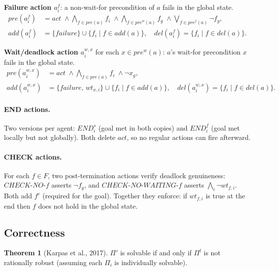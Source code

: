 \documentclass{article}
\theoremstyle{definition}
\newtheorem{theorem}{Theorem}
\newcommand{\pre}{\mathit{pre}}
\newcommand{\pref}{\mathit{pre}^f}
\newcommand{\prew}{\mathit{pre}^w}
\newcommand{\add}{\mathit{add}}
\newcommand{\del}{\mathit{del}}
\newcommand{\act}{\mathit{act}}
\begin{document}
\medskip
\noindent\textbf{Failure action $a_i^f$}: a non-wait-for precondition of $a$ fails in the global state.
\begin{align*}
  \pre(a_i^f) &= \act \;\wedge \textstyle\bigwedge_{f \in \pre(a)} f_i \;\wedge \bigwedge_{f \in \prew(a)} f_g \;\wedge \bigvee_{f \in \pref(a)} \neg f_g, \\
  \add(a_i^f) &= \{\mathit{failure}\} \cup \{f_i \mid f \in \add(a)\}, \quad
  \del(a_i^f) = \{f_i \mid f \in \del(a)\}.
\end{align*}

\medskip
\noindent\textbf{Wait/deadlock action $a_i^{w,x}$} for each $x \in \prew(a)$: $a$'s wait-for precondition $x$ fails in the global state.
\begin{align*}
  \pre(a_i^{w,x}) &= \act \;\wedge \textstyle\bigwedge_{f \in \pre(a)} f_i \;\wedge \neg x_g, \\
  \add(a_i^{w,x}) &= \{\mathit{failure},\, \mathit{wt}_{x,i}\} \cup \{f_i \mid f \in \add(a)\}, \quad
  \del(a_i^{w,x}) = \{f_i \mid f \in \del(a)\}.
\end{align*}

\paragraph{END actions.}
Two versions per agent: $\mathit{END}_i^s$ (goal met in both copies) and $\mathit{END}_i^f$ (goal met locally but not globally). Both delete $\act$, so no regular actions can fire afterward.

\paragraph{CHECK actions.}
For each $f \in F$, two post-termination actions verify deadlock genuineness:
$\mathit{CHECK\text{-}NO}\text{-}f$ asserts $\neg f_g$, and
$\mathit{CHECK\text{-}NO\text{-}WAITING}\text{-}f$ asserts $\bigwedge_i \neg \mathit{wt}_{f,i}$.
Both add $f^c$ (required for the goal). Together they enforce: if $\mathit{wt}_{f,i}$ is true at the end then $f$ does not hold in the global state.

\subsection{Correctness}

\begin{theorem}[Karpas et al., 2017]
  $\Pi'$ is solvable if and only if $\Pi^l$ is not rationally robust (assuming each $\Pi_i$ is individually solvable).
\end{theorem}
\end{document}
